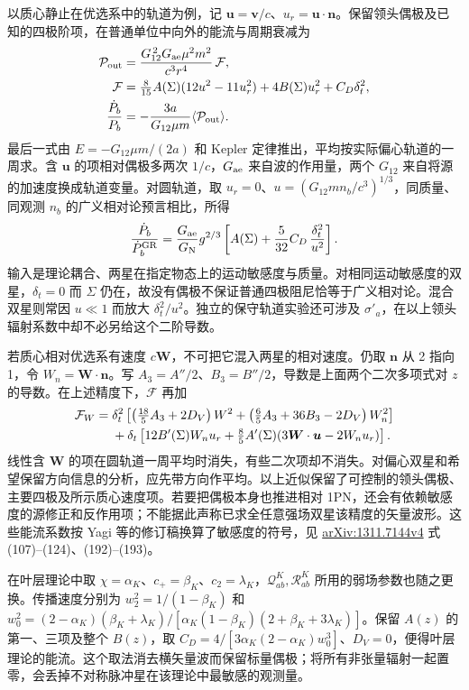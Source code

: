 以质心静止在优选系中的轨道为例，记 $\bm u=\bm v/c$、$u_r=\bm u\cdot\bm n$。保留领头偶极及已知的四极阶项，在普通单位中向外的能流与周期衰减为
\begin{align*}
 {\cal P}_{\rm out}&=\frac{G_{12}^{\,2}G_{\rm ae}\mu^2m^2}{c^3 r^4}\,{\cal F},\\
 {\cal F}&=\tfrac8{15}A(\Sigma)(12u^2-11u_r^2)
                   +4B(\Sigma)u_r^2+C_D\delta_t^2,\\
 \frac{\dot P_b}{P_b}&=-\frac{3a}{G_{12}\mu m}
                              \langle{\cal P}_{\rm out}\rangle .
\end{align*}
最后一式由 $E=-G_{12}\mu m/(2a)$ 和 Kepler 定律推出，平均按实际偏心轨道的一周求。含 $\bm u$ 的项相对偶极多两次 $1/c$，$G_{\rm ae}$ 来自波的作用量，两个 $G_{12}$ 来自将源的加速度换成轨道变量。对圆轨道，取 $u_r=0$、$u=(G_{12}mn_b/c^3)^{1/3}$，同质量、同观测 $n_b$ 的广义相对论预言相比，所得
\[
 \frac{\dot P_b}{\dot P_b^{\rm GR}}
  =\frac{G_{\rm ae}}{G_{\rm N}}g^{2/3}
    \left[A(\Sigma)+\frac5{32}C_D\,\frac{\delta_t^2}{u^2}\right].
\]
输入是理论耦合、两星在指定物态上的运动敏感度与质量。对相同运动敏感度的双星，$\delta_t=0$ 而 $\Sigma$ 仍在，故没有偶极不保证普通四极阻尼恰等于广义相对论。混合双星则常因 $u\ll1$ 而放大 $\delta_t^2/u^2$。独立的保守轨道实验还可涉及 $\sigma'_a$，在以上领头辐射系数中却不必另给这个二阶导数。

若质心相对优选系有速度 $c\bm W$，不可把它混入两星的相对速度。仍取 $\bm n$ 从 2 指向 1，令 $W_n=\bm W\cdot\bm n$。写 $A_3=A''/2$、$B_3=B''/2$，导数是上面两个二次多项式对 $z$ 的导数。在上述精度下，$\mathcal F$ 再加
\begin{align*}
 {\cal F}_{W}={}&\delta_t^2
 \left[\left(\tfrac{18}{5}A_3+2D_V\right)W^2
       +\left(\tfrac65 A_3+36B_3-2D_V\right)W_n^2\right]\\
 &+\delta_t\left[12 B'(\Sigma)W_n u_r
          +\tfrac85 A'(\Sigma)(3\bm W\cdot\bm u-2W_nu_r)\right].
\end{align*}
线性含 $\bm W$ 的项在圆轨道一周平均时消失，有些二次项却不消失。对偏心双星和希望保留方向信息的分析，应先带方向作平均。以上近似保留了可控制的领头偶极、主要四极及所示质心速度项。若要把偶极本身也推进相对 1PN，还会有依赖敏感度的源修正和反作用项；不能据此声称已求全任意强场双星该精度的矢量波形。这些能流系数按 Yagi 等的修订稿换算了敏感度的符号，见 \href{https://arxiv.org/abs/1311.7144v4}{arXiv:1311.7144v4} 式 (107)--(124)、(192)--(193)。

在叶层理论中取 $\chi=\alpha_K$、$c_+=\beta_K$、$c_2=\lambda_K$，$\mathcal Q_{ab}^{K},\mathcal R_{ab}^{K}$ 所用的弱场参数也随之更换。传播速度分别为 $w_2^2=1/(1-\beta_K)$ 和 $w_0^2=(2-\alpha_K)(\beta_K+\lambda_K)/[\alpha_K(1-\beta_K)(2+\beta_K+3\lambda_K)]$。保留 $A(z)$ 的第一、三项及整个 $B(z)$，取 $C_D=4/[3\alpha_K(2-\alpha_K)w_0^3]$、$D_V=0$，便得叶层理论的能流。这个取法消去横矢量波而保留标量偶极；将所有非张量辐射一起置零，会丢掉不对称脉冲星在该理论中最敏感的观测量。

